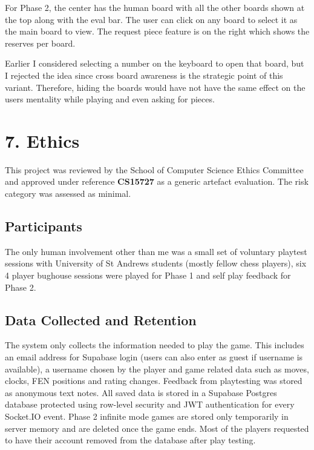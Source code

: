 \documentclass[11pt,a4paper]{article}
\begin{document}
For Phase 2,  the center has the human board with all the other boards shown at the top along with the eval bar. The user can click on any board to select it as the main board to view. The request piece feature is on the right which shows the reserves per board.

Earlier I considered selecting a number on the keyboard to open that board, but I rejected the idea since cross board awareness is the strategic point of this variant. Therefore, hiding the boards would have not have the same effect on the users mentality while playing and even asking for pieces.

\section*{7. Ethics}

This project was reviewed by the School of Computer Science Ethics Committee and approved under reference \textbf{CS15727} as a generic artefact evaluation. The risk category was assessed as minimal.

\subsection*{Participants}
The only human involvement other than me was a small set of voluntary playtest sessions with University of St Andrews students (mostly fellow chess players), six 4 player bughouse sessions were played for Phase 1 and self play feedback for Phase 2.

\subsection*{Data Collected and Retention}
The system only collects the information needed to play the game. This includes an email address for Supabase login (users can also enter as guest if username is available), a username chosen by the player and game related data such as moves, clocks, FEN positions and rating changes. Feedback from playtesting was stored as anonymous text notes. All saved data is stored in a Supabase Postgres database protected using row-level security and JWT authentication for every Socket.IO event. Phase 2 infinite mode games are stored only temporarily in server memory and are deleted once the game ends. Most of the players requested to have their account removed from the database after play testing.
\end{document}
